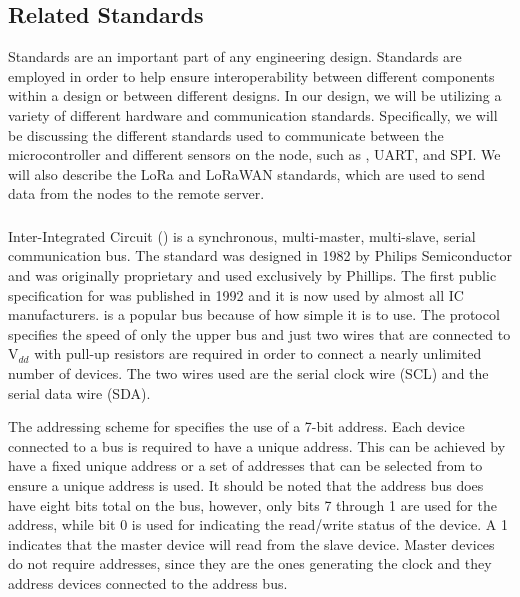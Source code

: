 \subsection{Related Standards}
Standards are an important part of any engineering design. Standards are employed in order to help ensure interoperability between different components within a design or between different designs. In our design, we will be utilizing a variety of different hardware and communication standards. Specifically, we will be discussing the different standards used to communicate between the microcontroller and different sensors on the node, such as \iic, UART, and SPI. We will also describe the LoRa and LoRaWAN standards, which are used to send data from the nodes to the remote server.

\subsubsection{\iic}
Inter-Integrated Circuit (\iic) is a synchronous, multi-master, multi-slave, serial communication bus. The standard was designed in 1982 by Philips Semiconductor and was originally proprietary and used exclusively by Phillips. The first public specification for \iic  was published in 1992 and it is now used by almost all IC manufacturers. \iic is a popular bus because of how simple it is to use. The protocol specifies the speed of only the upper bus and just two wires that are connected to V$_{dd}$ with pull-up resistors are required in order to connect a nearly unlimited number of \iic devices. The two wires used are the serial clock wire (SCL) and the serial data wire (SDA). 

The addressing scheme for \iic specifies the use of a 7-bit address. Each \iic device connected to a bus is required to have a unique address. This can be achieved by have a fixed unique address or a set of \iic addresses that can be selected from to ensure a unique address is used. It should be noted that the address bus does have eight bits total on the bus, however, only bits 7 through 1 are used for the address, while bit 0 is used for indicating the read/write status of the device. A 1 indicates that the master device will read from the slave device. Master devices do not require addresses, since they are the ones generating the clock and they address \iic devices connected to the address bus.

